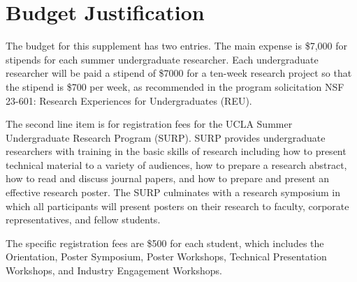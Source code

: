 \section*{Budget Justification}

The budget for this supplement has two entries.  The main expense is \$7,000 for stipends for each summer undergraduate researcher.
Each undergraduate researcher will be paid a stipend of \$7000 for a ten-week research project so that the stipend is \$700 per week, as recommended in the program solicitation NSF 23-601: Research Experiences for Undergraduates (REU).

The second line item is for registration fees for the UCLA Summer Undergraduate Research Program (SURP).
SURP provides undergraduate researchers with training in the basic skills of research including how to present technical material to a variety of audiences, how to prepare a research abstract, how to read and discuss journal papers, and how to prepare and present an effective research poster.  The SURP culminates with a research symposium in which all participants will present posters on their research to faculty, corporate representatives, and fellow students.

The specific registration fees are \$500 for each student, which includes the Orientation, Poster Symposium, Poster Workshops, Technical Presentation Workshops, and Industry Engagement Workshops.